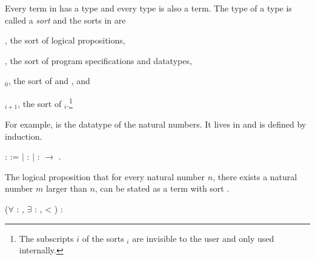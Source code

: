 Every term in \Coq has a type and every type is also a
term. The type of a type is called a \emph{sort} and the sorts
in \Coq are
\begin{compactitem}
\item {}, the sort of logical propositions,
\item {}, the sort of program specifications and datatypes,
\item {}$_0$, the sort of  and
  , and
\item {}$_{i+1}$, the sort of
  $_i$.\footnote{The subscripts $i$ of the sorts
    $_i$ are invisible to the user and only used
    internally.}
\end{compactitem}
For example,
is the datatype of the natural numbers. It lives in  and
is defined by induction.
\begin{singlespace}
\begin{coqdoccode}
\coqdocnoindent
{} 
:
 :=\coqdoceol
\coqdocindent{1.0em}
\ensuremath{|} 
:
\coqdoceol
\coqdocindent{1.0em}
\ensuremath{|} 
:
 $\rightarrow$
.\coqdoceol
\end{coqdoccode}
\end{singlespace}
The logical proposition that for every natural number $n$, there
exists a natural number $m$ larger than $n$, can be stated as a term
with sort .
\begin{singlespace}
\begin{coqdoccode}
\coqdocnoindent
(\ensuremath{\forall}  :
,
\ensuremath{\exists}  :
,
 < ) : \coqdoceol
\end{coqdoccode}
\end{singlespace}

